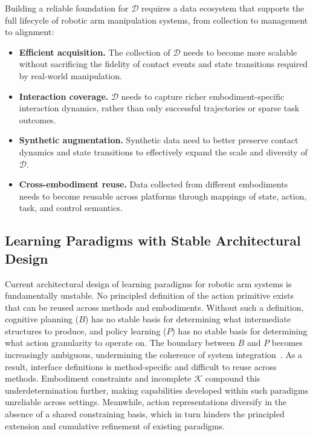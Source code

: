 \documentclass[acmsmall,screen,review]{acmart}
\begin{document}
Building a reliable foundation for $\mathcal{D}$ requires a data ecosystem that supports the full lifecycle of robotic arm manipulation systems, from collection to management to alignment:
\begin{itemize}
  \item \textbf{Efficient acquisition.} The collection of $\mathcal{D}$ needs to become more scalable without sacrificing the fidelity of contact events and state transitions required by real-world manipulation.
  \item \textbf{Interaction coverage.} $\mathcal{D}$ needs to capture richer embodiment-specific interaction dynamics, rather than only successful trajectories or sparse task outcomes.
  \item \textbf{Synthetic augmentation.} Synthetic data need to better preserve contact dynamics and state transitions to effectively expand the scale and diversity of $\mathcal{D}$.
  \item \textbf{Cross-embodiment reuse.} Data collected from different embodiments needs to become reusable across platforms through mappings of state, action, task, and control semantics.
\end{itemize}

\subsection{Learning Paradigms with Stable Architectural Design}\label{sec:challenge_learning}

Current architectural design of learning paradigms for robotic arm systems is fundamentally unstable.
No principled definition of the action primitive exists that can be reused across methods and embodiments.
Without such a definition, cognitive planning (\(B\)) has no stable basis for determining what intermediate structures to produce, and policy learning (\(P\)) has no stable basis for determining what action granularity to operate on.
The boundary between \(B\) and \(P\) becomes increasingly ambiguous, undermining the coherence of system integration~\cite{li2026robointer}.
As a result, interface definitions is method-specific and difficult to reuse across methods.
Embodiment constraints and incomplete $\mathcal{K}$ compound this underdetermination further, making capabilities developed within such paradigms unreliable across settings.
Meanwhile, action representations diversify in the absence of a shared constraining basis, which in turn hinders the principled extension and cumulative refinement of existing paradigms.
\end{document}
